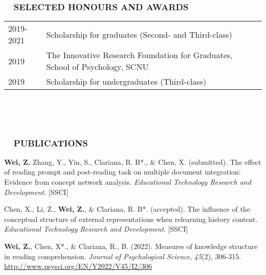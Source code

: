 \documentclass[a4paper, 12pt]{article}
\begin{document}
\  \par 
\  \par 



\subsubsection*{ \ \ SELECTED HONOURS AND AWARDS}

\begin{tabularx}{\textwidth}{p{2cm} X}

    2019-2021 & Scholarship for graduates (Second- and Third-class)\\

    2019 & The Innovative Research Foundation for Graduates, School of Psychology, SCNU \\
    
    2019 & Scholarship for undergraduates (Third-class)
    
\end{tabularx}

\  \par
\  \par


\subsubsection*{ \ \ PUBLICATIONS}

\begin{description}
    
    \item \textbf{Wei, Z.} Zhang, Y., Yin, S., Clariana, R. B*., \& Chen, X. (submitted). The effect of reading prompt and post-reading task on multiple document integration: Evidence from concept network analysis. \textit{Educational Technology Research and Development}. [SSCI]

    \item Chen, X., Li, Z., \textbf{Wei, Z.}, \& Clariana, R. B*. (accepted). The influence of the conceptual structure of external representations when relearning history content.  \textit{Educational Technology Research and Development}. [SSCI]

    \item \textbf{Wei, Z.}, Chen, X*., \& Clariana, R., B. (2022). Measures of knowledge structure in reading comprehension. \textit{Journal of Psychological Science}, \textit{45}(2), 306-315. \href{http://www.psysci.org/EN/Y2022/V45/I2/306}{http://www.psysci.org/EN/Y2022/V45/I2/306}

    
    \end{description}
\end{document}
